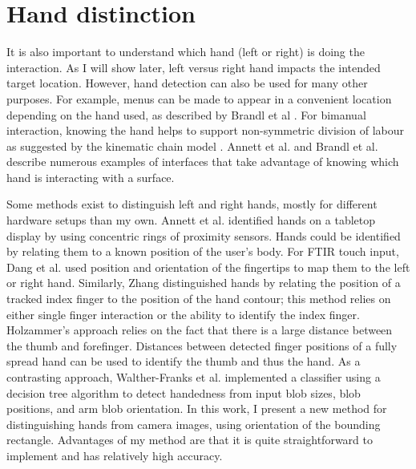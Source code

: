 \section{Hand distinction}
It is also important to understand which hand (left or right) is doing the interaction. As I will show later, left versus right hand impacts the intended target location. 
However, hand detection can also be used for many other purposes. 
For example, menus can be made to appear in a convenient location depending on the hand used, as described by Brandl et al \cite{Brandl:2007:ARPSUDPHG}. 
For bimanual interaction, knowing the hand helps to support non-symmetric division of labour as suggested by the kinematic chain model \cite{Guiard:1987:ADLHSBA}.  
Annett et al. \cite{Annett:2011:MPAMT} and Brandl et al. \cite{Brandl:2008:CMBBPDTHS} describe numerous examples of interfaces that take advantage of knowing which hand is interacting with a surface.

Some methods exist to distinguish left and right hands, mostly for different hardware setups than my own. 
Annett et al. \cite{Annett:2011:MPAMT} identified hands on a tabletop display by using concentric rings of proximity sensors. Hands could be identified by relating them to a known position of the user's body. 
For FTIR touch input, Dang et al. \cite{Dang:2009:HDMTTI} used position and orientation of the fingertips to map them to the left or right hand. 
Similarly, Zhang \cite{Zhang:2012:EFOFPAMTS} distinguished hands by relating the position of a tracked index finger to the position of the hand contour; this method relies on either single finger interaction or the ability to identify the index finger. 
Holzammer's approach \cite{Holzammer:2009:CDIFTIR} relies on the fact that there is a large distance between the thumb and forefinger. 
Distances between detected finger positions of a fully spread hand can be used to identify the thumb and thus the hand. 
As a contrasting approach, Walther-Franks et al. \cite{Walther:2011:LRHDMTD} implemented a classifier using a decision tree algorithm to detect handedness from input blob sizes, blob positions, and arm blob orientation.
In this work, I present a new method for distinguishing hands from camera images, using orientation of the bounding rectangle. 
Advantages of my method are that it is quite straightforward to implement and
has relatively high accuracy.
